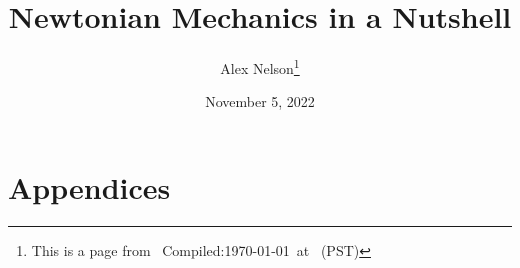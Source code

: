 \documentclass{article}
\title{Newtonian Mechanics in a Nutshell}
\author{Alex Nelson\thanks{This is a page from \homeurl{}\hfil\break\indent\;\, Compiled:\enspace\today\ at \currenttime\ (PST)}}
\date{November 5, 2022}
\begin{document}
\maketitle

\tableofcontents



\vfill\eject
\appendix
\part*{Appendices}

\end{document}
